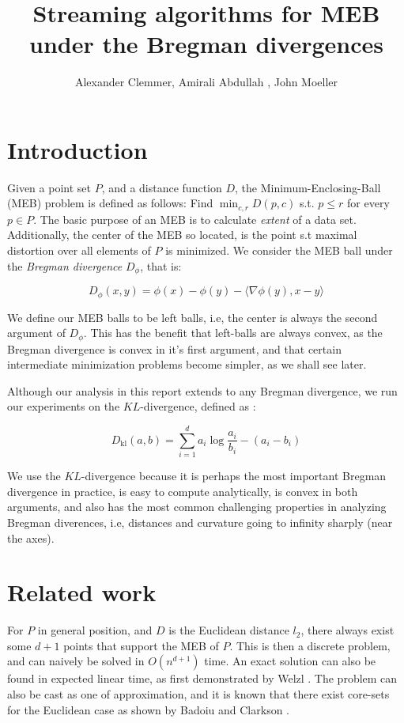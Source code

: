 \documentclass[11pt]{myclass}
\title{Streaming algorithms for MEB under the Bregman divergences}
\author{Alexander Clemmer, Amirali Abdullah , John Moeller}
\newcommand{\breg}{\ensuremath{D_\phi}}
\begin{document}
\maketitle

\section{Introduction}
Given a point set $P$, and a distance function $D$, the Minimum-Enclosing-Ball (MEB) problem is defined as follows: Find $\min_{c,r} D(p,c)$ s.t. $p\leq r$ for every $p \in P$. The basic purpose of an MEB is to calculate \emph{extent} of a data set. Additionally, the center of the MEB so located, 
is the point s.t maximal distortion over all elements of $P$ is minimized. We consider the MEB ball under the \emph{Bregman divergence}  $\breg$, that is:

\begin{equation}
 \breg(x,y) = \phi(x) - \phi(y) - \langle \nabla \phi(y), x-y\rangle
\end{equation}

We define our MEB balls to be left balls, i.e, the center is always the second argument of $\breg$. This has the benefit that left-balls are always convex, as the Bregman divergence is convex in it's first argument, and that certain intermediate minimization problems become simpler, as we shall see later.

Although our analysis in this report extends to any Bregman divergence, we run our experiments on the $KL$-divergence, defined as :

\begin{equation}
D_{\text{kl}}(a,b) = \sum_{i=1}^{d} a_i \log \frac{a_i}{b_i} - (a_i - b_i)
\end{equation}

We use the $KL$-divergence because it is perhaps the most important Bregman divergence in practice, is easy to compute analytically, is convex in both arguments, and also has the most common challenging properties in analyzing Bregman diverences, i.e, distances and curvature going to infinity sharply (near the axes). 

\section{Related work}
 For $P$ in general position, and $D$ is the Euclidean distance $l_2$, there always exist some $d+1$ points that support the MEB of $P$. This is then a discrete problem, and can naively be solved in $O(n^{d+1})$ time. An exact solution can also be found in expected linear time, as first demonstrated by Welzl \cite{exact}. The problem can also be cast as one of approximation, and it is known that there exist core-sets for the Euclidean case as shown by Badoiu and Clarkson \cite{bc}.
\end{document}

